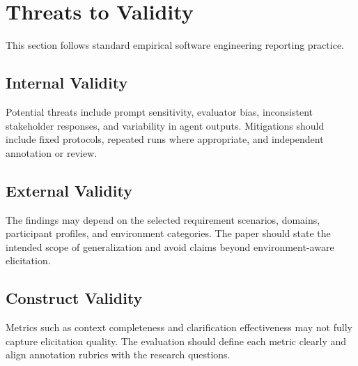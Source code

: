\section{Threats to Validity}
\label{threats}

This section follows standard empirical software engineering reporting practice.

\subsection{Internal Validity}
\label{threats:internal}

Potential threats include prompt sensitivity, evaluator bias, inconsistent stakeholder responses, and variability in agent outputs.
Mitigations should include fixed protocols, repeated runs where appropriate, and independent annotation or review.

\subsection{External Validity}
\label{threats:external}

The findings may depend on the selected requirement scenarios, domains, participant profiles, and environment categories.
The paper should state the intended scope of generalization and avoid claims beyond environment-aware elicitation.

\subsection{Construct Validity}
\label{threats:construct}

Metrics such as context completeness and clarification effectiveness may not fully capture elicitation quality.
The evaluation should define each metric clearly and align annotation rubrics with the research questions.
